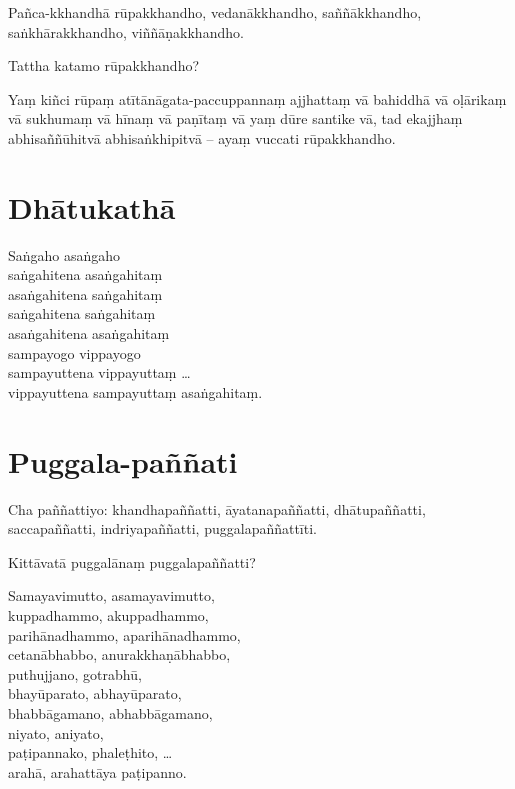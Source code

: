 Pañca-kkhandhā rūpakkhandho, vedanākkhandho, saññākkhandho, saṅkhārakkhandho,
viññāṇakkhandho.

Tattha katamo rūpakkhandho?

Yaṃ kiñci rūpaṃ atītānāgata-paccuppannaṃ ajjhattaṃ vā bahiddhā vā oḷārikaṃ vā
sukhumaṃ vā hīnaṃ vā paṇītaṃ vā yaṃ dūre santike vā, tad ekajjhaṃ
abhisaññūhitvā abhisaṅkhipitvā -- ayaṃ vuccati rūpakkhandho.


\clearpage

\section{Dhātukathā}

Saṅgaho asaṅgaho\\
saṅgahitena asaṅgahitaṃ\\
asaṅgahitena saṅgahitaṃ\\
saṅgahitena saṅgahitaṃ\\
asaṅgahitena asaṅgahitaṃ\\
sampayogo vippayogo\\
sampayuttena vippayuttaṃ \ldots\\
vippayuttena sampayuttaṃ asaṅgahitaṃ.


\section{Puggala-paññati}

Cha paññattiyo: khandhapaññatti, āyatanapaññatti, dhātupaññatti, saccapaññatti,
indriyapaññatti, puggalapaññattīti.

Kittāvatā puggalānaṃ puggalapaññatti?

Samayavimutto, asamayavimutto,\\
kuppadhammo, akuppadhammo,\\
parihānadhammo, aparihānadhammo,\\
cetanābhabbo, anurakkhaṇābhabbo,\\
puthujjano, gotrabhū,\\
bhayūparato, abhayūparato,\\
bhabbāgamano, abhabbāgamano,\\
niyato, aniyato,\\
paṭipannako, phaleṭhito, \ldots\\
arahā, arahattāya paṭipanno.


